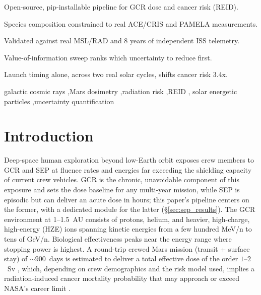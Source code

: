 \documentclass[a4paper,fleqn]{cas-dc}
\begin{document}
\begin{highlights}
\item Open-source, pip-installable pipeline for GCR dose and cancer risk (REID).
\item Species composition constrained to real ACE/CRIS and PAMELA measurements.
\item Validated against real MSL/RAD and 8 years of independent ISS telemetry.
\item Value-of-information sweep ranks which uncertainty to reduce first.
\item Launch timing alone, across two real solar cycles, shifts cancer risk 3.4x.
\end{highlights}

\begin{keywords}
galactic cosmic rays \sep Mars dosimetry \sep radiation risk \sep REID \sep
solar energetic particles \sep uncertainty quantification
\end{keywords}

\maketitle

\section{Introduction}
\label{sec:intro}

Deep-space human exploration beyond low-Earth orbit exposes crew members to
GCR and SEP at fluence
rates and energies far exceeding the shielding capacity of current crew
vehicles. GCR is the chronic, unavoidable component of this exposure and
sets the dose baseline for any multi-year mission, while SEP is episodic
but can deliver an acute dose in hours; this paper's pipeline centers on
the former, with a dedicated module for the latter (\S\ref{sec:sep_results}).
The GCR environment at 1--1.5~AU consists of protons, helium, and heavier,
high-charge, high-energy (HZE) ions spanning kinetic energies from a few
hundred MeV/n to tens of GeV/n. Biological effectiveness peaks near the
energy range where stopping power is highest.
A round-trip crewed Mars mission (transit + surface stay) of
$\sim\!900$~days is estimated to deliver a total effective dose of the order
$1$--$2$~Sv \citep{zeitlin2013}, which, depending on crew demographics and
the risk model used, implies a radiation-induced cancer mortality probability
that may approach or exceed NASA's career limit \citep{nasa2014}.
\end{document}
